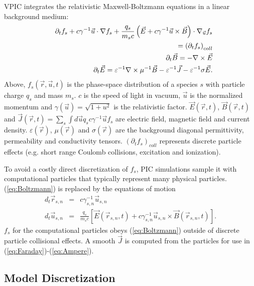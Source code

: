 \documentclass[journal,twoside]{IEEEtran}
\newcommand{\eps}{\varepsilon}
\newcommand{\vecr}{\vec{r}}
\newcommand{\vecu}{\vec{u}}
\newcommand{\vecJ}{\vec{J}}
\newcommand{\vecE}{\vec{E}}
\newcommand{\vecB}{\vec{B}}
\newcommand{\Deriv}[2]{d_{#2}#1}
\newcommand{\PDeriv}[2]{\partial_{#2}#1}
\newcommand{\DotP}[2]{#1 \cdot #2}
\newcommand{\CrossP}[2]{#1 \times #2}
\newcommand{\Grad}[1]{\nabla #1}
\newcommand{\Curl}[1]{\nabla \times #1}
\newcommand{\Gradu}[1]{\nabla_{\vecu} #1}
\newcommand{\eq}[1]{(\ref{eq:#1})}
\begin{document}
VPIC integrates the relativistic Maxwell-Boltzmann equations in a
linear background medium:
\begin{eqnarray}
&&\PDeriv{f_s}{t} + 
\DotP{c\gamma^{-1}\vecu}{\Grad{f_s}} +
\DotP{\frac{q_s}{m_s c}\left(\vecE+\CrossP{c\gamma^{-1}\vecu}{\vecB}\right)}
{\Gradu{f_s}}\nonumber\\
&&\hspace{0.27in} =
\left(\PDeriv{f_s}{t}\right)_{coll}\label{eq:Boltzmann}\\
&&\PDeriv{\vecB}{t} = -\Curl{\vecE} \label{eq:Faraday}\\
&&\PDeriv{\vecE}{t} =
\eps^{-1}\Curl{\mu^{-1}\vecB} - \eps^{-1}\vecJ - \eps^{-1}\sigma\vecE
\label{eq:Ampere}
.
\end{eqnarray}
Above, $f_s\left(\vecr,\vecu,t\right)$ is the phase-space distribution
of a species $s$ with particle charge $q_s$ and mass $m_s$.  $c$ is
the speed of light in vacuum, $\vecu$ is the normalized momentum and
$\gamma\left(\vecu\right) = \sqrt{1 + u^2}$ is the relativistic
factor.  $\vecE\left(\vecr,t\right)$, $\vecB\left(\vecr,t\right)$ and
$\vecJ\left(\vecr,t\right) = \sum_s \int d\vecu q_s c\gamma^{-1}\vecu
f_s$ are electric field, magnetic field and current density.
$\eps\left(\vecr\right)$, $\mu\left(\vecr\right)$ and
$\sigma\left(\vecr\right)$ are the background diagonal permittivity,
permeability and conductivity tensors.
$\left(\PDeriv{f_s}{t}\right)_{coll}$ represents discrete particle
effects (e.g. short range Coulomb collisions, excitation and
ionization).

To avoid a costly direct discretization of $f_s$, PIC simulations
sample it with computational particles that typically represent many
physical particles.  \eq{Boltzmann} is replaced by the equations of
motion
\begin{eqnarray}
\Deriv{\vecr_{s,n}}{t} &=& c \gamma_{s,n}^{-1} \vecu_{s,n} \label{eq:Position}\\
\Deriv{\vecu_{s,n}}{t} &=& \frac{q_s}{m_s c} \left[
\vecE\left(\vecr_{s,n},t\right) +
\CrossP{c\gamma_{s,n}^{-1}\vecu_{s,n}}{\vecB\left(\vecr_{s,n},t\right)}
\right] \label{eq:Momentum}
.
\end{eqnarray}
$f_s$ for the computational particles obeys \eq{Boltzmann} outside of
discrete particle collisional effects.  A smooth $\vecJ$ is computed
from the particles for use in \eq{Faraday}-\eq{Ampere}.

\subsection{Model Discretization}
\end{document}

